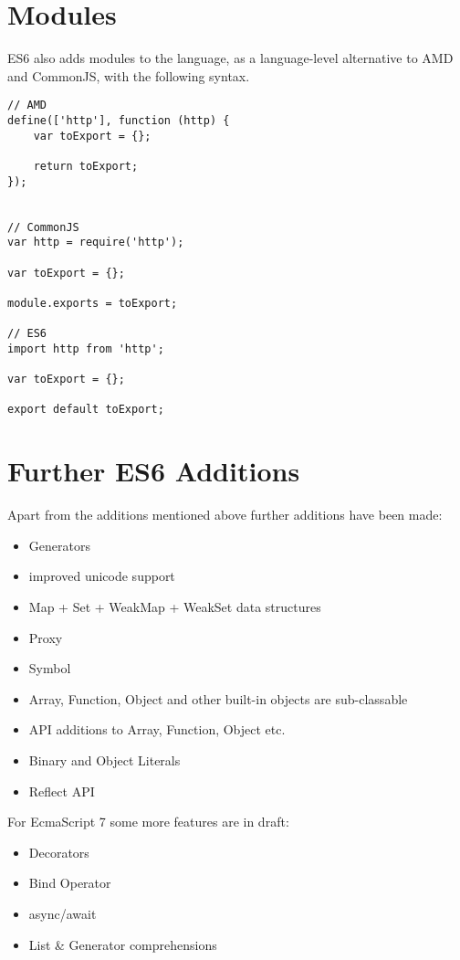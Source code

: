 \documentclass{bioinfo}
\begin{document}
\vfill\break

\section{Modules}
ES6 also adds modules to the language, as a language-level alternative to AMD and
CommonJS, with the following syntax.

\begin{lstlisting}
// AMD
define(['http'], function (http) {
    var toExport = {};

    return toExport;
});


// CommonJS
var http = require('http');

var toExport = {};

module.exports = toExport;

// ES6
import http from 'http';

var toExport = {};

export default toExport;
\end{lstlisting}

\section{Further ES6 Additions}
Apart from the additions mentioned above further additions have been made:
\begin{itemize}
    \item Generators
    \item improved unicode support
    \item Map + Set + WeakMap + WeakSet data structures
    \item Proxy
    \item Symbol
    \item Array, Function, Object and other built-in objects are sub-classable
    \item API additions to Array, Function, Object etc.
    \item Binary and Object Literals
    \item Reflect API
\end{itemize}

For EcmaScript 7 some more features are in draft:
\begin{itemize}
    \item Decorators
    \item Bind Operator
    \item async/await
    \item List \& Generator comprehensions
\end{itemize}
\end{document}

